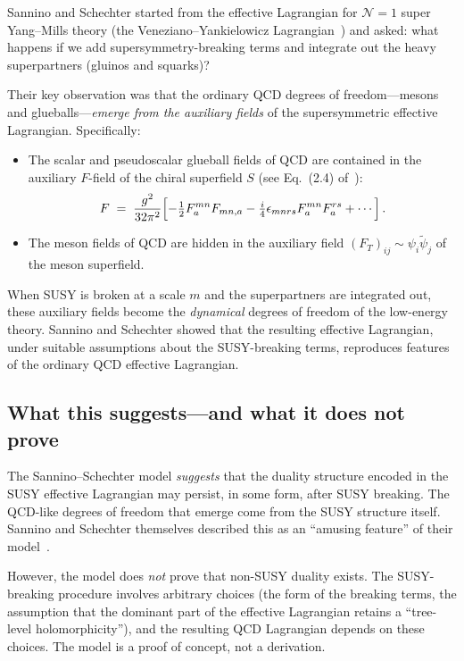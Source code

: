 \documentclass[11pt,a4paper]{article}
\begin{document}
Sannino and Schechter started from the effective Lagrangian for
$\mathcal{N}=1$ super Yang--Mills theory (the Veneziano--Yankielowicz
Lagrangian~\cite{VY1982}) and asked: what happens if we add
supersymmetry-breaking terms and integrate out the heavy superpartners
(gluinos and squarks)?

Their key observation was that the ordinary QCD degrees of
freedom---mesons and glueballs---\emph{emerge from the auxiliary fields}
of the supersymmetric effective Lagrangian.  Specifically:
\begin{itemize}
  \item The scalar and pseudoscalar glueball fields of QCD are
    contained in the auxiliary $F$-field of the chiral superfield $S$
    (see Eq.~(2.4) of~\cite{SS1997}):
    \begin{equation}\label{eq:F-field}
      F \;=\; \frac{g^2}{32\pi^2}\Bigl[
        -\tfrac{1}{2} F_a^{mn} F_{mn,a}
        - \tfrac{i}{4}\epsilon_{mnrs} F_a^{mn} F_a^{rs}
        + \cdots
      \Bigr]\,.
    \end{equation}
  \item The meson fields of QCD are hidden in the auxiliary field
    $(F_T)_{ij} \sim \psi_i \widetilde{\psi}_j$ of the meson
    superfield.
\end{itemize}

When SUSY is broken at a scale $m$ and the superpartners are
integrated out, these auxiliary fields become the \emph{dynamical}
degrees of freedom of the low-energy theory.  Sannino and Schechter
showed that the resulting effective Lagrangian, under suitable
assumptions about the SUSY-breaking terms, reproduces features of the
ordinary QCD effective Lagrangian.

\subsection{What this suggests---and what it does not prove}

The Sannino--Schechter model \emph{suggests} that the duality structure
encoded in the SUSY effective Lagrangian may persist, in some form,
after SUSY breaking.  The QCD-like degrees of freedom that emerge come
from the SUSY structure itself.
Sannino and Schechter themselves described this as an ``amusing feature''
of their model~\cite{SS1997}.

However, the model does \emph{not} prove that non-SUSY duality exists.
The SUSY-breaking procedure involves arbitrary choices (the form of
the breaking terms, the assumption that the dominant part of the
effective Lagrangian retains a ``tree-level holomorphicity''), and the
resulting QCD Lagrangian depends on these choices.  The model is a
proof of concept, not a derivation.
\end{document}
